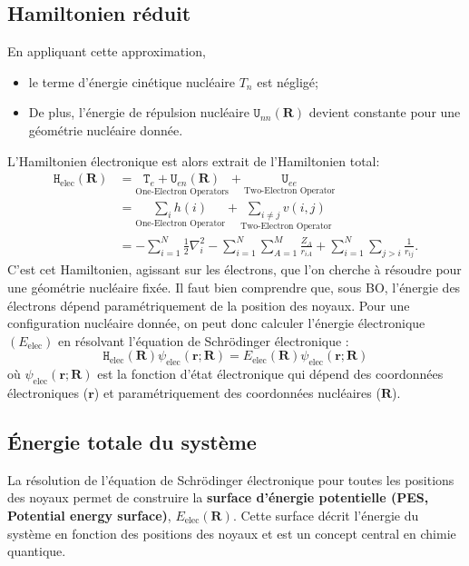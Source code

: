 \documentclass[12pt,a4paper]{article} %
\numberwithin{equation}{section} %
\numberwithin{figure}{section} %
\numberwithin{table}{section} %
\begin{document}
\subsection{Hamiltonien réduit}

En appliquant cette approximation,
\begin{itemize}
\item le terme d'énergie cinétique nucléaire $T_n$ est négligé; 
\item De plus, l'énergie de répulsion nucléaire $\mathtt{U}_{nn}(\mathbf{R})$ devient constante pour une géométrie nucléaire donnée.
\end{itemize}  
L'Hamiltonien électronique est alors extrait de l'Hamiltonien total:
\begin{equation}
\begin{split}
\mathtt{H}_{\text{elec}}(\mathbf{R}) &= \underset{\text{One-Electron Operators}}{\mathtt{T}_e + \mathtt{U}_{en}(\mathbf{R})} + \underset{\text{Two-Electron Operator}}{\mathtt{U}_{ee}}\\
&= \underset{\text{One-Electron Operator}}{\sum_i h(i)} + \underset{\text{Two-Electron Operator}}{\sum_{i\ne j}v(i, j)}\\
&=-\sum_{i=1}^N \frac12 \nabla_i^2 - \sum_{i=1}^N \sum_{A=1}^M \frac{Z_A}{r_{iA}} + \sum_{i=1}^N \sum_{j>i} \frac{1}{r_{ij}} .
\end{split}
\end{equation}
C'est cet Hamiltonien, agissant sur les électrons, que l'on cherche à résoudre pour une géométrie nucléaire fixée. Il faut bien comprendre que, sous BO, l'énergie des électrons dépend paramétriquement de la position des noyaux. Pour une configuration nucléaire donnée, on peut donc calculer l'énergie électronique $(E_{\text{elec}})$ en résolvant l'équation de Schrödinger électronique :
\begin{equation}
\mathtt{H}_{\text{elec}}(\mathbf{R}) \psi_{\text{elec}}(\mathbf{r}; \mathbf{R}) = E_{\text{elec}}(\mathbf{R}) \psi_{\text{elec}}(\mathbf{r}; \mathbf{R})
\end{equation}
où $\psi_{\text{elec}}(\mathbf{r}; \mathbf{R})$ est la fonction d'état électronique qui dépend des coordonnées électroniques ($\mathbf{r}$) et paramétriquement des coordonnées nucléaires ($\mathbf{R}$).

\subsection{Énergie totale du système}

La résolution de l'équation de Schrödinger électronique pour toutes les positions des noyaux permet de construire la \textbf{surface d'énergie potentielle (PES, Potential energy surface)}, $E_{\text{elec}}(\mathbf{R})$. Cette surface décrit l'énergie du système en fonction des positions des noyaux et est un concept central en chimie quantique.
\end{document}
